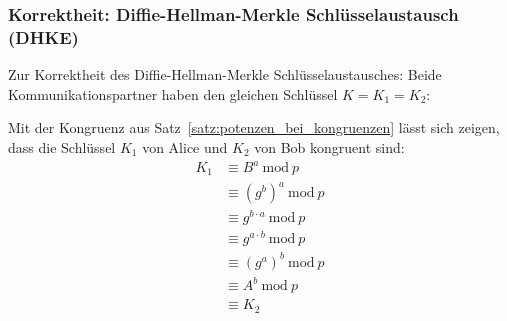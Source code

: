 \documentclass[
  a4paper,
  11pt,
]{scrartcl}
\theoremstyle{plain}
\theoremstyle{definition}
\theoremstyle{remark}
\newcommand{\Mod}[1]{\ \mathrm{mod}\ #1}
\begin{document}
\subsubsection{Korrektheit: Diffie-Hellman-Merkle Schlüsselaustausch (DHKE)}
\label{sub:dhke_proof}
Zur Korrektheit des Diffie-Hellman-Merkle Schlüsselaustausches: Beide
Kommunikationspartner haben den gleichen Schlüssel $K = K_1 = K_2$:

Mit der Kongruenz aus Satz~\ref{satz:potenzen_bei_kongruenzen} lässt sich zeigen, dass die Schlüssel $K_1$ von Alice und $K_2$ von Bob kongruent
sind:
\begin{align*}
  K_1 & \equiv B^a \Mod{p}\\
  & \equiv {(g^b)}^a \Mod{p}\\
  & \equiv g^{b \cdot a} \Mod{p}\\
  & \equiv g^{a \cdot b} \Mod{p}\\
  & \equiv {(g^a)}^b \Mod{p}\\
  & \equiv A^b \Mod{p}\\
  & \equiv K_2
\end{align*}
\end{document}
